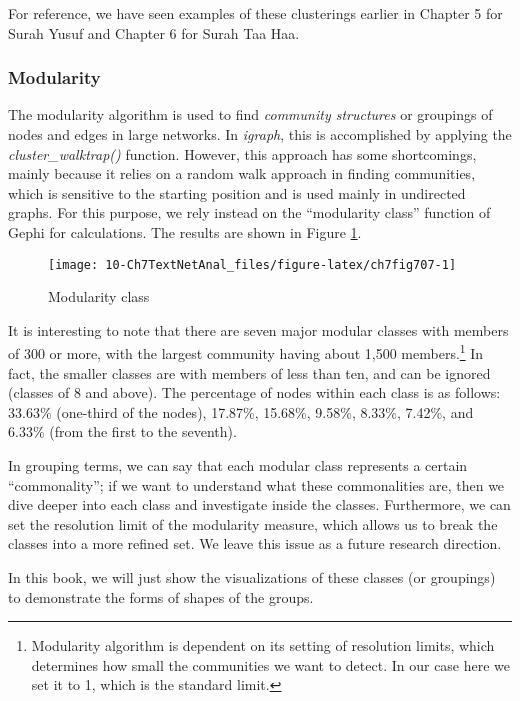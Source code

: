 \documentclass[
]{article}
\begin{document}
For reference, we have seen examples of these clusterings earlier in Chapter 5 for Surah Yusuf and Chapter 6 for Surah Taa Haa.

\hypertarget{modularity}{%
\subsubsection{Modularity}\label{modularity}}

The modularity algorithm is used to find \emph{community structures} or groupings of nodes and edges in large networks. In \emph{igraph}, this is accomplished by applying the \emph{cluster\_walktrap()} function. However, this approach has some shortcomings, mainly because it relies on a random walk approach in finding communities, which is sensitive to the starting position and is used mainly in undirected graphs. For this purpose, we rely instead on the ``modularity class'' function of Gephi for calculations. The results are shown in Figure \ref{fig:ch7fig707}.

\begin{figure}

{\centering \texttt{[image: 10-Ch7TextNetAnal\_files/figure-latex/ch7fig707-1]} 

}

\caption{Modularity class}\label{fig:ch7fig707}
\end{figure}

It is interesting to note that there are seven major modular classes with members of 300 or more, with the largest community having about 1,500 members.\footnote{Modularity algorithm is dependent on its setting of resolution limits, which determines how small the communities we want to detect. In our case here we set it to 1, which is the standard limit.} In fact, the smaller classes are with members of less than ten, and can be ignored (classes of 8 and above). The percentage of nodes within each class is as follows: 33.63\% (one-third of the nodes), 17.87\%, 15.68\%, 9.58\%, 8.33\%, 7.42\%, and 6.33\% (from the first to the seventh).

In grouping terms, we can say that each modular class represents a certain ``commonality''; if we want to understand what these commonalities are, then we dive deeper into each class and investigate inside the classes. Furthermore, we can set the resolution limit of the modularity measure, which allows us to break the classes into a more refined set. We leave this issue as a future research direction.

In this book, we will just show the visualizations of these classes (or groupings) to demonstrate the forms of shapes of the groups.
\end{document}
